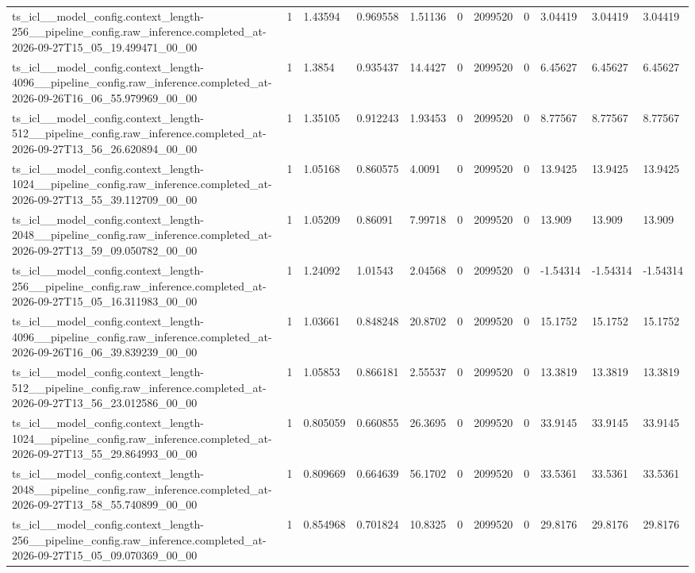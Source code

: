 \begin{tabular}{lllllllllll}
ts\_icl\_\_model\_config.context\_length-256\_\_pipeline\_config.raw\_inference.completed\_at-2026-09-27T15\_05\_19.499471\_00\_00 & 1 & 1.43594 & 0.969558 & 1.51136 & 0 & 2099520 & 0 & 3.04419 & 3.04419 & 3.04419 \\
ts\_icl\_\_model\_config.context\_length-4096\_\_pipeline\_config.raw\_inference.completed\_at-2026-09-26T16\_06\_55.979969\_00\_00 & 1 & 1.3854 & 0.935437 & 14.4427 & 0 & 2099520 & 0 & 6.45627 & 6.45627 & 6.45627 \\
ts\_icl\_\_model\_config.context\_length-512\_\_pipeline\_config.raw\_inference.completed\_at-2026-09-27T13\_56\_26.620894\_00\_00 & 1 & 1.35105 & 0.912243 & 1.93453 & 0 & 2099520 & 0 & 8.77567 & 8.77567 & 8.77567 \\
ts\_icl\_\_model\_config.context\_length-1024\_\_pipeline\_config.raw\_inference.completed\_at-2026-09-27T13\_55\_39.112709\_00\_00 & 1 & 1.05168 & 0.860575 & 4.0091 & 0 & 2099520 & 0 & 13.9425 & 13.9425 & 13.9425 \\
ts\_icl\_\_model\_config.context\_length-2048\_\_pipeline\_config.raw\_inference.completed\_at-2026-09-27T13\_59\_09.050782\_00\_00 & 1 & 1.05209 & 0.86091 & 7.99718 & 0 & 2099520 & 0 & 13.909 & 13.909 & 13.909 \\
ts\_icl\_\_model\_config.context\_length-256\_\_pipeline\_config.raw\_inference.completed\_at-2026-09-27T15\_05\_16.311983\_00\_00 & 1 & 1.24092 & 1.01543 & 2.04568 & 0 & 2099520 & 0 & -1.54314 & -1.54314 & -1.54314 \\
ts\_icl\_\_model\_config.context\_length-4096\_\_pipeline\_config.raw\_inference.completed\_at-2026-09-26T16\_06\_39.839239\_00\_00 & 1 & 1.03661 & 0.848248 & 20.8702 & 0 & 2099520 & 0 & 15.1752 & 15.1752 & 15.1752 \\
ts\_icl\_\_model\_config.context\_length-512\_\_pipeline\_config.raw\_inference.completed\_at-2026-09-27T13\_56\_23.012586\_00\_00 & 1 & 1.05853 & 0.866181 & 2.55537 & 0 & 2099520 & 0 & 13.3819 & 13.3819 & 13.3819 \\
ts\_icl\_\_model\_config.context\_length-1024\_\_pipeline\_config.raw\_inference.completed\_at-2026-09-27T13\_55\_29.864993\_00\_00 & 1 & 0.805059 & 0.660855 & 26.3695 & 0 & 2099520 & 0 & 33.9145 & 33.9145 & 33.9145 \\
ts\_icl\_\_model\_config.context\_length-2048\_\_pipeline\_config.raw\_inference.completed\_at-2026-09-27T13\_58\_55.740899\_00\_00 & 1 & 0.809669 & 0.664639 & 56.1702 & 0 & 2099520 & 0 & 33.5361 & 33.5361 & 33.5361 \\
ts\_icl\_\_model\_config.context\_length-256\_\_pipeline\_config.raw\_inference.completed\_at-2026-09-27T15\_05\_09.070369\_00\_00 & 1 & 0.854968 & 0.701824 & 10.8325 & 0 & 2099520 & 0 & 29.8176 & 29.8176 & 29.8176 \\

\end{tabular}
